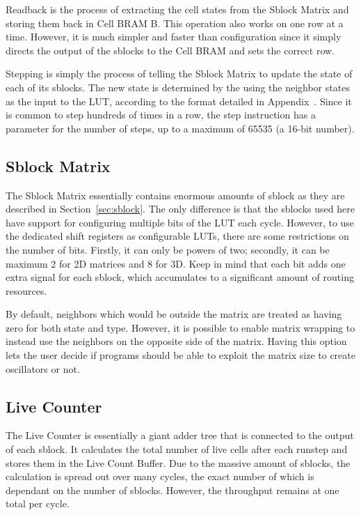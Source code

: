Readback is the process of extracting the cell states from the Sblock Matrix and storing them back in Cell BRAM B.
This operation also works on one row at a time.
However, it is much simpler and faster than configuration since it simply directs the output of the sblocks to the Cell BRAM and sets the correct row.

Stepping is simply the process of telling the Sblock Matrix to update the state of each of its sblocks.
The new state is determined by the using the neighbor states as the input to the LUT, according to the format detailed in Appendix~.
Since it is common to step hundreds of times in a row, the step instruction has a parameter for the number of steps, up to a maximum of 65535 (a 16-bit number).

\subsection{Sblock Matrix}

The Sblock Matrix essentially contains enormous amounts of sblock as they are described in Section~\ref{sec:sblock}.
The only difference is that the sblocks used here have support for configuring multiple bits of the LUT each cycle.
However, to use the dedicated shift registers as configurable LUTs, there are some restrictions on the number of bits.
Firstly, it can only be powers of two; secondly, it can be maximum 2 for 2D matrices and 8 for 3D.
Keep in mind that each bit adds one extra signal for each sblock, which accumulates to a significant amount of routing resources.

By default, neighbors which would be outside the matrix are treated as having zero for both state and type.
However, it is possible to enable matrix wrapping to instead use the neighbors on the opposite side of the matrix.
Having this option lets the user decide if programs should be able to exploit the matrix size to create oscillators or not.

\subsection{Live Counter}

The Live Counter is essentially a giant adder tree that is connected to the output of each sblock.
It calculates the total number of live cells after each runstep and stores them in the Live Count Buffer.
Due to the massive amount of sblocks, the calculation is spread out over many cycles, the exact number of which is dependant on the number of sblocks.
However, the throughput remains at one total per cycle.

